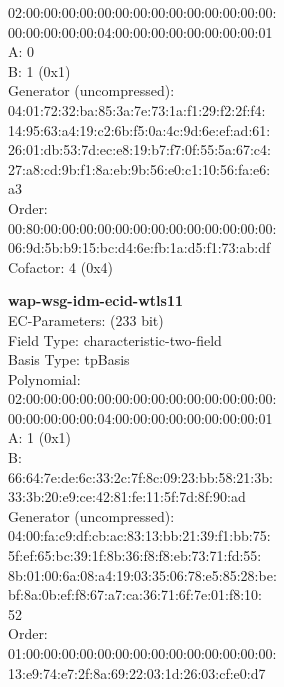     02:00:00:00:00:00:00:00:00:00:00:00:00:00:00:\\
    00:00:00:00:00:04:00:00:00:00:00:00:00:00:01\\
A:    0\\
B:    1 (0x1)\\
Generator (uncompressed):\\
    04:01:72:32:ba:85:3a:7e:73:1a:f1:29:f2:2f:f4:\\
    14:95:63:a4:19:c2:6b:f5:0a:4c:9d:6e:ef:ad:61:\\
    26:01:db:53:7d:ec:e8:19:b7:f7:0f:55:5a:67:c4:\\
    27:a8:cd:9b:f1:8a:eb:9b:56:e0:c1:10:56:fa:e6:\\
    a3\\
Order: \\
    00:80:00:00:00:00:00:00:00:00:00:00:00:00:00:\\
    06:9d:5b:b9:15:bc:d4:6e:fb:1a:d5:f1:73:ab:df\\
Cofactor:  4 (0x4)\\
\item \textbf{ wap-wsg-idm-ecid-wtls11 }\\
EC-Parameters: (233 bit)\\
Field Type: characteristic-two-field\\
Basis Type: tpBasis\\
Polynomial:\\
    02:00:00:00:00:00:00:00:00:00:00:00:00:00:00:\\
    00:00:00:00:00:04:00:00:00:00:00:00:00:00:01\\
A:    1 (0x1)\\
B:   \\
    66:64:7e:de:6c:33:2c:7f:8c:09:23:bb:58:21:3b:\\
    33:3b:20:e9:ce:42:81:fe:11:5f:7d:8f:90:ad\\
Generator (uncompressed):\\
    04:00:fa:c9:df:cb:ac:83:13:bb:21:39:f1:bb:75:\\
    5f:ef:65:bc:39:1f:8b:36:f8:f8:eb:73:71:fd:55:\\
    8b:01:00:6a:08:a4:19:03:35:06:78:e5:85:28:be:\\
    bf:8a:0b:ef:f8:67:a7:ca:36:71:6f:7e:01:f8:10:\\
    52\\
Order: \\
    01:00:00:00:00:00:00:00:00:00:00:00:00:00:00:\\
    13:e9:74:e7:2f:8a:69:22:03:1d:26:03:cf:e0:d7\\
